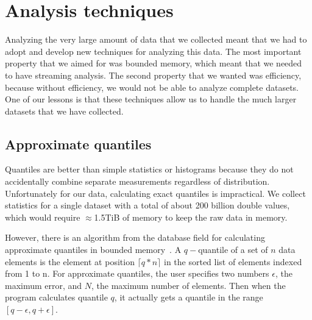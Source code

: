 \section{Analysis techniques}
\label{sec:analysis-techniques}


Analyzing the very large amount of data that we collected meant that
we had to adopt and develop new techniques for analyzing this data.
The most important property that we aimed for was bounded memory,
which meant that we needed to have streaming analysis.  The second
property that we wanted was efficiency, because without efficiency, we
would not be able to analyze complete datasets.  One of our lessons is
that these techniques allow us to handle the much larger datasets that
we have collected.

\subsection{Approximate quantiles}



Quantiles are better than simple statistics or histograms because they
do not accidentally combine separate measurements regardless of
distribution.  Unfortunately for our data, calculating exact quantiles
is impractical.  We collect statistics for a single dataset with a
total of about 200 billion double values, which would require
$\approx$1.5TiB of memory to keep the raw data in memory.

However, there is an algorithm from the database field for calculating
approximate quantiles in bounded
memory~\cite{Manku98approximatemedians}.  A $q-$quantile of a set of
$n$ data elements is the element at position $\lceil q*n\rceil$ in the
sorted list of elements indexed from 1 to n.  For approximate
quantiles, the user specifies two numbers $\epsilon$, the maximum
error, and $N$, the maximum number of elements.  Then when the program
calculates quantile $q$, it actually gets a quantile in the range
$[q-\epsilon,q+\epsilon]$.  

